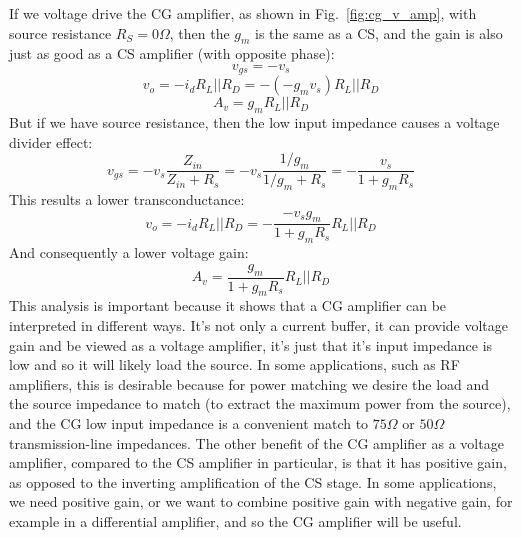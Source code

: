 If we voltage drive the CG amplifier, as shown in Fig.~\ref{fig:cg_v_amp}, with source resistance $R_S = 0\Omega$, then the $g_m$ is the same as a CS, and the gain is also just as good as a CS amplifier (with opposite phase):
\begin{equation}
	v_{gs} = -v_s 
\end{equation}
\begin{equation}
	v_{o} = - i_d R_L||R_D =  - (-g_m v_s) R_L||R_D 
\end{equation}
\begin{equation}
	A_v = g_m R_L||R_D
\end{equation}
But if we have source resistance, then the low input impedance causes a voltage divider effect:
\begin{equation}
	v_{gs} = -v_s \frac{Z_{in}}{Z_{in} + R_s} = -v_s \frac{1/g_m}{1/g_m + R_s} = - \frac{v_s}{1 + g_m R_s}
\end{equation}
This results a lower transconductance:
\begin{equation}
	v_{o} = - i_d R_L||R_D =  - \frac{-v_s g_m }{1 + g_m R_s} R_L||R_D 
\end{equation}
And consequently a lower voltage gain: 
\begin{equation}
	A_v = \frac{g_m }{1 + g_m R_s} R_L||R_D
\end{equation}
This analysis is important because it shows that a CG amplifier can be interpreted in different ways.  It's not only a current buffer, it can provide voltage gain and be viewed as a voltage amplifier, it's just that it's input impedance is low and so it will likely load the source.  In some applications, such as RF amplifiers, this is desirable because for power matching we desire the load and the source impedance to match (to extract the maximum power from the source), and the CG low input impedance is a convenient match to $75\Omega$ or $50\Omega$ transmission-line impedances.  The other benefit of the CG amplifier as a voltage amplifier, compared to the CS amplifier in particular, is that it has positive gain, as opposed to the inverting amplification of the CS stage.  In some applications, we need positive gain, or we want to combine positive gain with negative gain, for example in a differential amplifier, and so the CG amplifier will be useful.
